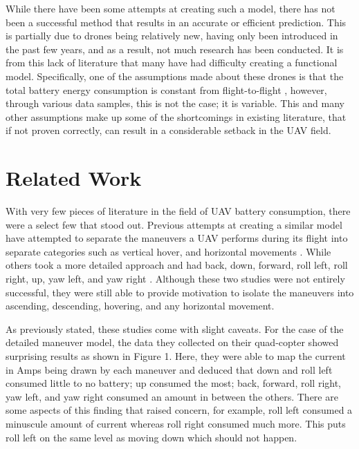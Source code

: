 \documentclass{article}
\begin{document}
While there have been some attempts at creating such a model, there has not been a successful method that results in an accurate or efficient prediction. This is partially due to drones being relatively new, having only been introduced in the past few years, and as a result, not much research has been conducted. It is from this lack of literature that many have had difficulty creating a functional model. Specifically, one of the assumptions made about these drones is that the total battery energy consumption is constant from flight-to-flight \cite{Prasetia}, however, through various data samples, this is not the case; it is variable. This and many other assumptions make up some of the shortcomings in existing literature, that if not proven correctly, can result in a considerable setback in the UAV field. 


\section{Related Work}
With very few pieces of literature in the field of UAV battery consumption, there were a select few that stood out. Previous attempts at creating a similar model have attempted to separate the maneuvers a UAV performs during its flight into separate categories such as vertical hover, and horizontal movements \cite{Prasetia}. While others took a more detailed approach and had back, down, forward, roll left, roll right, up, yaw left, and yaw right \cite{Corral}. Although these two studies were not entirely successful, they were still able to provide motivation to isolate the maneuvers into ascending, descending, hovering, and any horizontal movement.\par

As previously stated, these studies come with slight caveats. For the case of the detailed maneuver model, the data they collected on their quad-copter showed surprising results as shown in Figure 1. Here, they were able to map the current in Amps being drawn by each maneuver and deduced that down and roll left consumed little to no battery; up consumed the most; back, forward, roll right, yaw left, and yaw right consumed an amount in between the others. There are some aspects of this finding that raised concern, for example, roll left consumed a minuscule amount of current whereas roll right consumed much more. This puts roll left on the same level as moving down which should not happen. \par
\end{document}
